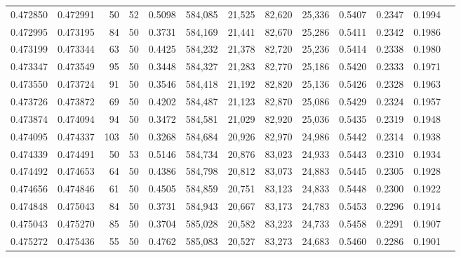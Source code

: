 \begin{tabular}{rrrrrrrrrrrrr}
0.472850 & 0.472991 &    50 &  52 &                                     0.5098 & 584,085 &  21,525 &  82,620 &  25,336 & 0.5407 & 0.2347 & 0.1994 \\
0.472995 & 0.473195 &    84 &  50 &                                     0.3731 & 584,169 &  21,441 &  82,670 &  25,286 & 0.5411 & 0.2342 & 0.1986 \\
0.473199 & 0.473344 &    63 &  50 &                                     0.4425 & 584,232 &  21,378 &  82,720 &  25,236 & 0.5414 & 0.2338 & 0.1980 \\
0.473347 & 0.473549 &    95 &  50 &                                     0.3448 & 584,327 &  21,283 &  82,770 &  25,186 & 0.5420 & 0.2333 & 0.1971 \\
0.473550 & 0.473724 &    91 &  50 &                                     0.3546 & 584,418 &  21,192 &  82,820 &  25,136 & 0.5426 & 0.2328 & 0.1963 \\
0.473726 & 0.473872 &    69 &  50 &                                     0.4202 & 584,487 &  21,123 &  82,870 &  25,086 & 0.5429 & 0.2324 & 0.1957 \\
0.473874 & 0.474094 &    94 &  50 &                                     0.3472 & 584,581 &  21,029 &  82,920 &  25,036 & 0.5435 & 0.2319 & 0.1948 \\
0.474095 & 0.474337 &   103 &  50 &                                     0.3268 & 584,684 &  20,926 &  82,970 &  24,986 & 0.5442 & 0.2314 & 0.1938 \\
0.474339 & 0.474491 &    50 &  53 &                                     0.5146 & 584,734 &  20,876 &  83,023 &  24,933 & 0.5443 & 0.2310 & 0.1934 \\
0.474492 & 0.474653 &    64 &  50 &                                     0.4386 & 584,798 &  20,812 &  83,073 &  24,883 & 0.5445 & 0.2305 & 0.1928 \\
0.474656 & 0.474846 &    61 &  50 &                                     0.4505 & 584,859 &  20,751 &  83,123 &  24,833 & 0.5448 & 0.2300 & 0.1922 \\
0.474848 & 0.475043 &    84 &  50 &                                     0.3731 & 584,943 &  20,667 &  83,173 &  24,783 & 0.5453 & 0.2296 & 0.1914 \\
0.475043 & 0.475270 &    85 &  50 &                                     0.3704 & 585,028 &  20,582 &  83,223 &  24,733 & 0.5458 & 0.2291 & 0.1907 \\
0.475272 & 0.475436 &    55 &  50 &                                     0.4762 & 585,083 &  20,527 &  83,273 &  24,683 & 0.5460 & 0.2286 & 0.1901 \\

\end{tabular}
